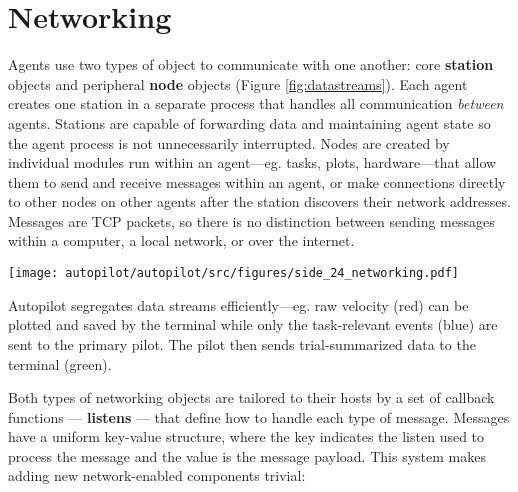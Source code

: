 \section{Networking}
\label{sec:networking}


Agents use two types of object to communicate with one another: core \textbf{station} objects and peripheral \textbf{node} objects (Figure \ref{fig:datastreams}). Each agent creates one station in a separate process that handles all communication \textit{between} agents. Stations are capable of forwarding data and maintaining agent state so the agent process is not unnecessarily interrupted. Nodes are created by individual modules run within an agent---eg. tasks, plots, hardware---that allow them to send and receive messages within an agent, or make connections directly to other nodes on other agents after the station discovers their network addresses. Messages are TCP packets, so there is no distinction between sending messages within a computer, a local network, or over the internet.

\begin{marginfigure}[0.8cm]
\texttt{[image: autopilot/autopilot/src/figures/side\_24\_networking.pdf]}
\caption{Autopilot segregates data streams efficiently---eg. raw velocity (red) can be plotted and saved by the terminal while only the task-relevant events (blue) are sent to the primary pilot. The pilot then sends trial-summarized data to the terminal (green).}
\label{fig:datastreams}
\end{marginfigure}

Both types of networking objects are tailored to their hosts by a set of callback functions --- \textbf{listens} --- that define how to handle each type of message. Messages have a uniform key-value structure, where the key indicates the listen used to process the message and the value is the message payload. This system makes adding new network-enabled components trivial:

